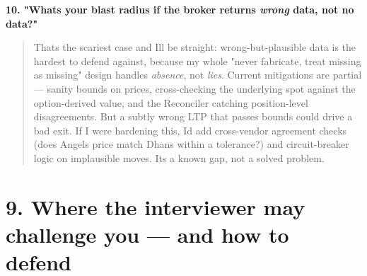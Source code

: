 \documentclass[11pt]{article}
\begin{document}
\textbf{10. "What\textquotesingle s your blast radius if the broker returns \emph{wrong} data, not no data?"}

\begin{quote}
That\textquotesingle s the scariest case and I\textquotesingle ll be straight: wrong-but-plausible data is the hardest to defend
against, because my whole "never fabricate, treat missing as missing" design handles \emph{absence},
not \emph{lies}. Current mitigations are partial --- sanity bounds on prices, cross-checking the
underlying spot against the option-derived value, and the Reconciler catching position-level
disagreements. But a subtly wrong LTP that passes bounds could drive a bad exit. If I were
hardening this, I\textquotesingle d add cross-vendor agreement checks (does Angel\textquotesingle s price match Dhan\textquotesingle s within a
tolerance?) and circuit-breaker logic on implausible moves. It\textquotesingle s a known gap, not a solved
problem.
\end{quote}

\section{9. Where the interviewer may challenge you --- and how to defend}\label{9-where-the-interviewer-may-challenge-you--and-how-to-defend}
\end{document}
